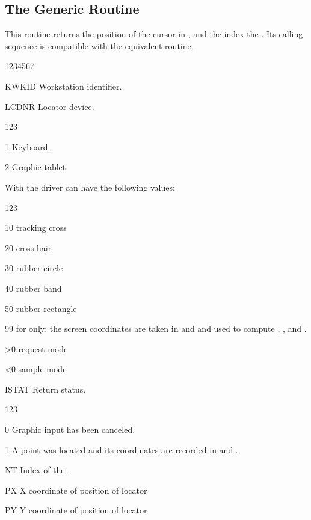 \subsection{The Generic Routine}
\Action
This routine returns the  position of the cursor in \WC, and the
index the \NT. Its calling sequence is compatible with the equivalent \GKS{}
routine.
\Pdesc
\begin{DLtt}{1234567}
\item[KWKID]Workstation identifier.
\item[LCDNR]Locator device.
\begin{DLtt}{123}
\item[1] Keyboard.
\item[2] Graphic tablet.
\end{DLtt}
With the  driver  can have the following values:
\begin{DLtt}{123}
\item[10] tracking cross
\item[20] cross-hair
\item[30] rubber circle
\item[40] rubber band
\item[50] rubber rectangle
\item[99] for  only: the screen coordinates are taken in  and
           and used to compute , , and .
\item[>0] request mode
\item[<0] sample mode
\end{DLtt}
\item[ISTAT] Return status.
\begin{DLtt}{123}
\item[0] Graphic input has been canceled.
\item[1] A point was located and its coordinates are recorded in
 and .
\end{DLtt}
\item[NT] Index of the \NT.
\item[PX] X coordinate of position of locator
\item[PY] Y coordinate of position of locator
\end{DLtt}
 
